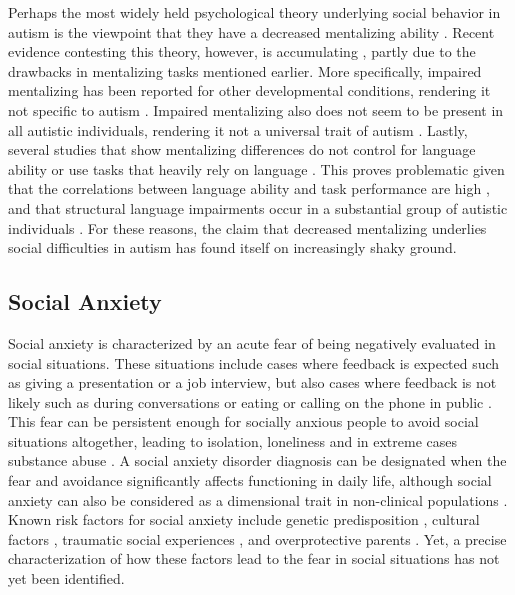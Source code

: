 Perhaps the most widely held psychological theory underlying social behavior in autism is the viewpoint that they have a decreased mentalizing ability \citep{baron-cohen1985}. Recent evidence contesting this theory, however, is accumulating \citep{gernsbacher2019}, partly due to the drawbacks in mentalizing tasks mentioned earlier. More specifically, impaired mentalizing has been reported for other developmental conditions, rendering it not specific to autism \citep{jenkins1996,loukusa2014}. Impaired mentalizing also does not seem to be present in all autistic individuals, rendering it not a universal trait of autism \citep{happe1993,moessnang2020}. Lastly, several studies that show mentalizing differences do not control for language ability or use tasks that heavily rely on language \citep{gernsbacher2005}. This proves problematic given that the correlations between language ability and task performance are high \citep{capage2001,shaked2006}, and that structural language impairments occur in a substantial group of autistic individuals \citep{velikonja2019}. For these reasons, the claim that decreased mentalizing underlies social difficulties in autism has found itself on increasingly shaky ground. 

\subsection*{Social Anxiety}

Social anxiety is characterized by an acute fear of being negatively evaluated in social situations. These situations include cases where feedback is expected such as giving a presentation or a job interview, but also cases where feedback is not likely such as during conversations or eating or calling on the phone in public \citep{apa2013}. This fear can be persistent enough for socially anxious people to avoid social situations altogether, leading to isolation, loneliness and in extreme cases substance abuse \citep{lemyre2019,lim2016}. A social anxiety disorder diagnosis can be designated when the fear and avoidance significantly affects functioning in daily life, although social anxiety can also be considered as a dimensional trait in non-clinical populations \citep{ruscio2010}. Known risk factors for social anxiety include genetic predisposition \citep{kendler1999}, cultural factors \citep{leung1994}, traumatic social experiences \citep{rapee2004}, and overprotective parents \citep{dulger2024,taylor2006}. Yet, a precise characterization of how these factors lead to the fear in social situations has not yet been identified. 

